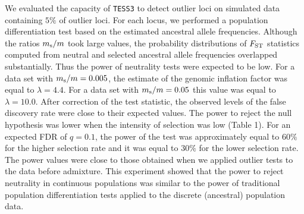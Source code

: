 We evaluated the capacity of {\tt TESS3} to detect outlier loci on simulated data containing $5\%$ of outlier loci. For each locus, we performed a population differentiation test based on the estimated ancestral allele frequencies. Although the ratios $m_{\rm s}/m$ took large values, the probability distributions of $F_{\rm ST}$ statistics computed from neutral and selected ancestral allele frequencies overlapped substantially. Thus the power of neutrality tests were expected to be low.  For a data set with $m_{\rm s}/m = 0.005$, the estimate of the genomic inflation factor was equal to $\lambda = 4.4$. For a data set with $m_{\rm s}/m = 0.05$ this value was equal to $\lambda = 10.0$. After correction of the test statistic, the observed levels of the false discovery rate were close to their expected values. The power to reject the null hypothesis was lower when the intensity of selection was low (Table 1). For an expected FDR of $q=0.1$, the power of the test was approximately equal to $60\%$ for the higher selection rate and it was equal to $30\%$ for the lower selection rate. The power values were close to those obtained when we applied outlier tests to the data before admixture. This experiment showed that the power to reject neutrality in continuous populations was similar to the power of traditional population differentiation tests applied to the discrete (ancestral) population data.  




